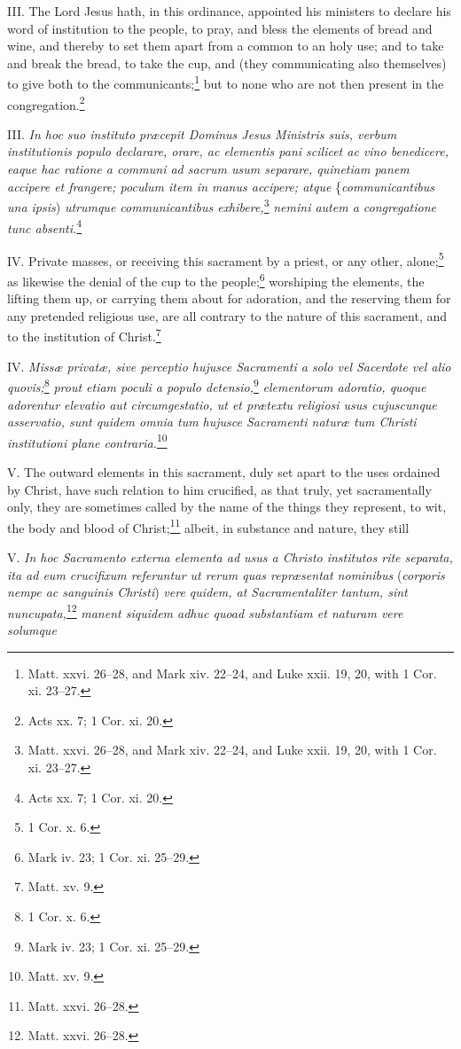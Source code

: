 III. The Lord Jesus hath, in this ordinance, appointed his ministers to declare his word of institution to the people, to pray, and bless the elements of bread and wine, and thereby to set them apart from a common to an holy use; and to take and break the bread, to take the cup, and (they communicating also themselves) to give both to the communicants;\footnote{Matt. xxvi. 26–28, and Mark xiv. 22–24, and Luke xxii. 19, 20, with 1 Cor. xi. 23–27.} but to none who are not then present in the congregation.\footnote{Acts xx. 7; 1 Cor. xi. 20.}

III. \emph{In hoc suo instituto præcepit Dominus Jesus Ministris suis, verbum institutionis populo declarare, orare, ac elementis pani scilicet ac vino benedicere, eaque hac ratione a communi ad sacrum usum separare, quinetiam panem accipere et frangere; poculum item in manus accipere; atque }\{\emph{communicantibus una ipsis})\emph{ utrumque communicantibus exhibere,}\footnote{Matt. xxvi. 26–28, and Mark xiv. 22–24, and Luke xxii. 19, 20, with 1 Cor. xi. 23–27.}\emph{ nemini autem a congregatione tunc absenti.}\footnote{Acts xx. 7; 1 Cor. xi. 20.}

IV. Private masses, or receiving this sacrament by a priest, or any other, alone;\footnote{1 Cor. x. 6.} as likewise the denial of the cup to the people;\footnote{Mark iv. 23; 1 Cor. xi. 25–29.} worshiping the elements, the lifting them up, or carrying them about for adoration, and the reserving them for any pretended religious use, are all contrary to the nature of this sacrament, and to the institution of Christ.\footnote{Matt. xv. 9.}

IV. \emph{Missæ privatæ, sive perceptio hujusce Sacramenti a solo vel Sacerdote vel alio quovis;}\footnote{1 Cor. x. 6.}\emph{ prout etiam poculi a populo detensio,}\footnote{Mark iv. 23; 1 Cor. xi. 25–29.}\emph{ elementorum adoratio, quoque adorentur elevatio aut circumgestatio, ut et prætextu religiosi usus cujuscunque asservatio, sunt quidem omnia tum hujusce Sacramenti naturæ tum Christi institutioni plane contraria.}\footnote{Matt. xv. 9.}

V. The outward elements in this sacrament, duly set apart to the uses ordained by Christ, have such relation to him crucified, as that truly, yet sacramentally only, they are sometimes called by the name of the things they represent, to wit, the body and blood of Christ;\footnote{Matt. xxvi. 26–28.} albeit, in substance and nature, they still

V. \emph{In hoc Sacramento externa elementa ad usus a Christo institutos rite separata, ita ad eum crucifixum referuntur ut rerum quas repræsentat nominibus }(\emph{corporis nempe ac sanguinis Christi})\emph{ vere quidem, at Sacramentaliter tantum, sint nuncupata,}\footnote{Matt. xxvi. 26–28.}\emph{ manent siquidem adhuc quoad substantiam et naturam vere solumque }

